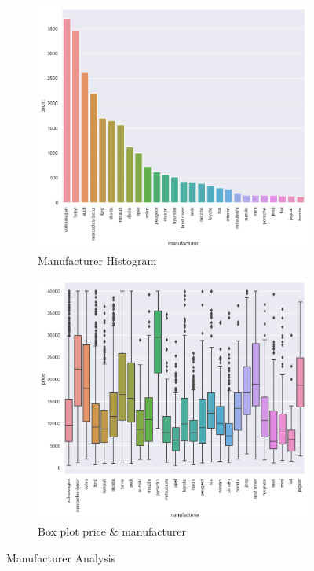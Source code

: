 \begin{itemize}
    \begin{figure}[!h]
        \begin{subfigure}[b]{0.48\linewidth}
            \centering
            \includegraphics[width=\linewidth]{images/priceprediction/histograms/manufacturer-hist.png}
            \caption{Manufacturer Histogram}
            \label{fig:manufacturer-hist}
        \end{subfigure}
        \hfill
        \begin{subfigure}[b]{0.48\linewidth}
            \centering
            \includegraphics[width=\linewidth]{images/priceprediction/boxplots/manufacturer_price.png}
            \caption{Box plot price \& manufacturer}
            \label{fig:manufacturer-box}
        \end{subfigure}
        \caption{Manufacturer Analysis}
        \label{fig:manufacturer-analysis}
    \end{figure}
    

\end{itemize}
